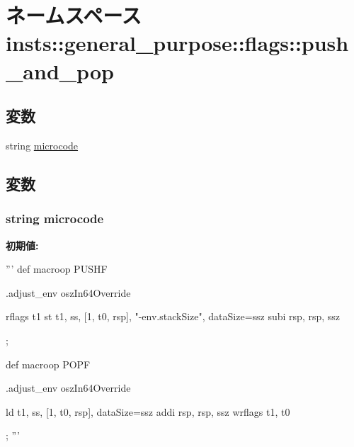 \hypertarget{namespaceinsts_1_1general__purpose_1_1flags_1_1push__and__pop}{
\section{ネームスペース insts::general\_\-purpose::flags::push\_\-and\_\-pop}
\label{namespaceinsts_1_1general__purpose_1_1flags_1_1push__and__pop}
}
\subsection*{変数}
\begin{DoxyCompactItemize}
\item 
string \hyperlink{namespaceinsts_1_1general__purpose_1_1flags_1_1push__and__pop_a770f11a173e99389a8802f0107ed8f52}{microcode}
\end{DoxyCompactItemize}


\subsection{変数}
\hypertarget{namespaceinsts_1_1general__purpose_1_1flags_1_1push__and__pop_a770f11a173e99389a8802f0107ed8f52}{
\subsubsection[{microcode}]{\setlength{\rightskip}{0pt plus 5cm}string {\bf microcode}}}
\label{namespaceinsts_1_1general__purpose_1_1flags_1_1push__and__pop_a770f11a173e99389a8802f0107ed8f52}
{\bfseries 初期値:}
\begin{DoxyCode}
'''
def macroop PUSHF {
    .adjust_env oszIn64Override

    rflags t1
    st t1, ss, [1, t0, rsp], "-env.stackSize", dataSize=ssz
    subi rsp, rsp, ssz
};

def macroop POPF {
    .adjust_env oszIn64Override

    ld t1, ss, [1, t0, rsp], dataSize=ssz
    addi rsp, rsp, ssz
    wrflags t1, t0
};
'''
\end{DoxyCode}
